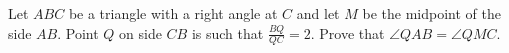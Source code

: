 \problem
Let $ABC$ be a triangle with a right angle at $C$ and let $M$ be the midpoint
of the side $AB$.
Point $Q$ on side $CB$ is such that $\frac{BQ}{QC} = 2$.
Prove that $\angle QAB = \angle QMC$.
\solution
\endproblem
